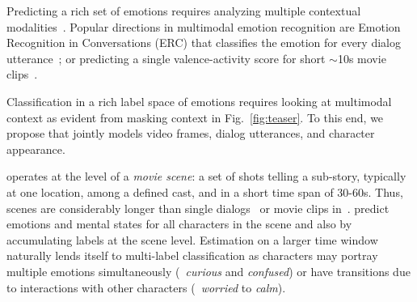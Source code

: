 Predicting a rich set of emotions requires analyzing multiple contextual modalities~\cite{emotic, caer, emoticon}.
Popular directions in multimodal emotion recognition are
Emotion Recognition in Conversations (ERC) that classifies the emotion for every dialog utterance~\cite{poria2019meld, dialogRNN, todkat};
or predicting a single valence-activity score for short $\sim$10s movie clips~\cite{BaveyeLIRIS, affect2mm}.

Classification in a rich label space of emotions requires looking at multimodal context as evident from masking context in Fig.~\ref{fig:teaser}.
To this end, we propose \modelname{} that jointly models video frames, dialog utterances, and character appearance.

\modelname{} operates at the level of a \emph{movie scene}: a set of shots telling a sub-story, typically at one location, among a defined cast, and in a short time span of 30-60s.
Thus, scenes are considerably longer than single dialogs~\cite{poria2019meld} or movie clips in~\cite{BaveyeLIRIS}.
\modelname{} predict emotions and mental states for all characters in the scene and also by accumulating labels at the scene level.
Estimation on a larger time window naturally lends itself to multi-label classification as characters may portray multiple emotions simultaneously (\eg~\emph{curious} and \emph{confused}) or have transitions due to interactions with other characters (\eg~\emph{worried} to \emph{calm}).


\vspace{-3mm}
